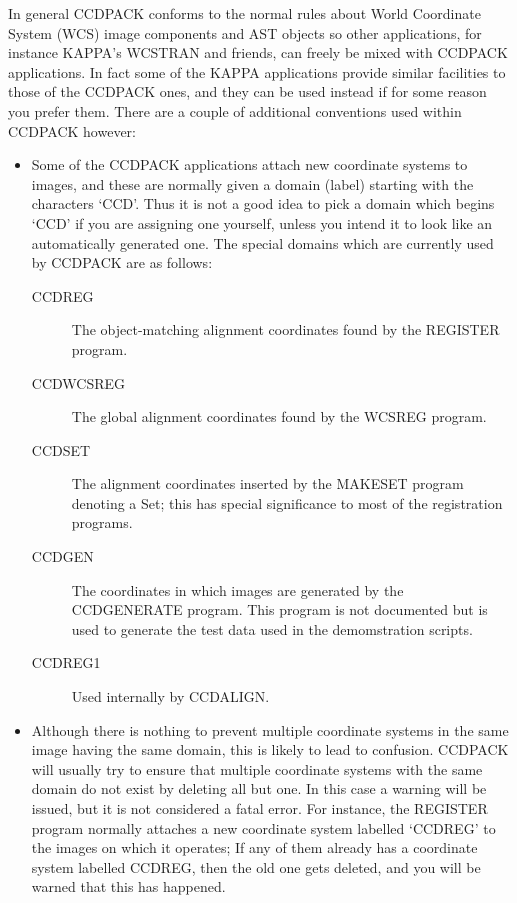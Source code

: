 \documentclass[twoside,11pt]{article}
\newcommand{\htmlref}[2]{#1}
\newcommand{\xref}[3]{#1}
\renewcommand{\_}{\texttt{\symbol{95}}}
\newcommand{\routine}[1]{{\sc #1}}
\newcommand{\xroutine}[1]{\htmlref{{\sc #1}}{#1}}
\begin{document}
In general CCDPACK conforms to the normal rules about World Coordinate
System (WCS) image components and AST objects
so other applications, for instance
KAPPA's \xref{WCSTRAN}{sun95}{WCSTRAN} and friends, can freely
be mixed with CCDPACK applications.  In fact some of the KAPPA
applications provide similar facilities to those of the CCDPACK
ones, and they can be used instead if for some reason you prefer
them.
There are a couple of additional conventions used within CCDPACK however:
\begin{itemize}
\item
Some of the CCDPACK applications attach 
new coordinate systems to images,
and these are normally given a domain (label) 
starting with the characters `CCD\_'.
Thus it is not a good idea to pick a domain which begins `CCD\_'
if you are assigning one yourself, unless you intend it to look
like an automatically generated one.
The special domains which are currently used by CCDPACK are as follows:
\begin{description}
\item[CCD\_REG]
The object-matching alignment coordinates 
found by the \xroutine{REGISTER} program.
\item[CCD\_WCSREG]
The global alignment coordinates found by the \xroutine{WCSREG} program.
\item[CCD\_SET]
The alignment coordinates inserted by the \xroutine{MAKESET} program
denoting a Set; this has special significance to most of the registration
programs.
\item[CCD\_GEN]
The coordinates in which images are generated by the \routine{CCDGENERATE}
program.  This program is not documented but is used to generate the
test data used in the demomstration scripts.
\item[CCD\_REG1]
Used internally by \xroutine{CCDALIGN}.
\end{description}

\item
Although there is nothing to prevent multiple coordinate systems 
in the same image having the same domain, this is likely to lead
to confusion.  CCDPACK will usually try to ensure that multiple
coordinate systems with the same domain do not exist by deleting all but one.
In this case a warning will be issued, but it is not considered
a fatal error.
For instance, the \routine{REGISTER} program normally attaches a new
coordinate system labelled `CCD\_REG' to the images on which it operates;
If any of them already has a coordinate system labelled CCD\_REG,
then the old one gets deleted, and you will be warned that this 
has happened.
\end{itemize}
\end{document}
